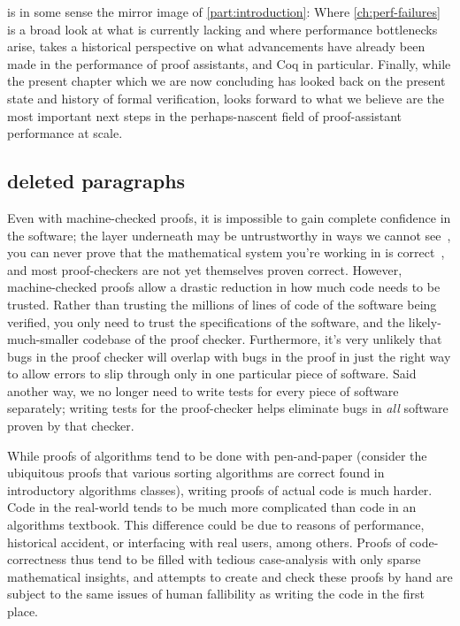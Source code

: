  is in some sense the mirror image of \autoref{part:introduction}:
Where \autoref{ch:perf-failures} is a broad look at what is currently lacking and where performance bottlenecks arise,  takes a historical perspective on what advancements have already been made in the performance of proof assistants, and Coq in particular.
Finally, while the present chapter which we are now concluding has looked back on the present state and history of formal verification,  looks forward to what we believe are the most important next steps in the perhaps-nascent field of proof-assistant performance at scale.


\begin{subappendices}

\section{deleted paragraphs}

Even with machine-checked proofs, it is impossible to gain complete confidence in the software; the layer underneath may be untrustworthy in ways we cannot see~\cite{Reflections1984Thompson}, you can never prove that the mathematical system you're working in is correct~\cite{sep-goedel-incompleteness}, and most proof-checkers are not yet themselves proven correct.
However, machine-checked proofs allow a drastic reduction in how much code needs to be trusted.
Rather than trusting the millions of lines of code of the software being verified, you only need to trust the specifications of the software, and the likely-much-smaller codebase of the proof checker.
Furthermore, it's very unlikely that bugs in the proof checker will overlap with bugs in the proof in just the right way to allow errors to slip through only in one particular piece of software.
Said another way, we no longer need to write tests for every piece of software separately; writing tests for the proof-checker helps eliminate bugs in \emph{all} software proven by that checker.

While proofs of algorithms tend to be done with pen-and-paper (consider the ubiquitous proofs that various sorting algorithms are correct found in introductory algorithms classes), writing proofs of actual code is much harder.
Code in the real-world tends to be much more complicated than code in an algorithms textbook.
This difference could be due to reasons of performance, historical accident, or interfacing with real users, among others.
Proofs of code-correctness thus tend to be filled with tedious case-analysis with only sparse mathematical insights, and attempts to create and check these proofs by hand are subject to the same issues of human fallibility as writing the code in the first place.


\end{subappendices}
